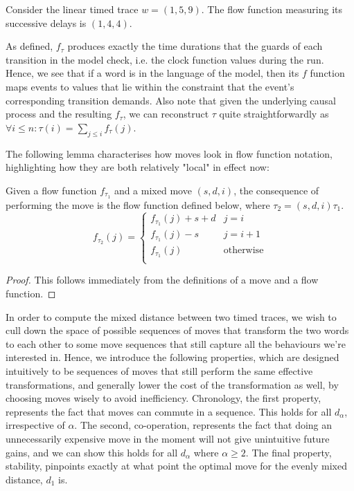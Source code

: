 \documentclass[runningheads]{llncs}
\newcounter{cases}
\begin{document}
    \begin{example}\label{wordandflow}
        Consider the linear timed trace $w = (1, 5, 9)$. The flow function measuring its successive delays is $(1, 4, 4)$. 
    \end{example}
    
    As defined, $f_\tau$ produces exactly the time durations that the guards of each transition in the model check, i.e. the clock function values during the run.
    Hence, we see that if a word is in the language of the model, then its $f$ function maps events to values that lie within the constraint that the event's corresponding transition demands. 
    Also note that given the underlying causal process and the resulting $f_\tau$, we can reconstruct $\tau$ quite straightforwardly as $\forall i \leq n: \tau(i) = \sum_{j \leq i} f_\tau(j)$. 
    
    The following lemma characterises how moves look in flow function notation, highlighting how they are both relatively "local" in effect now:
    
    \begin{lemma}\label{FlowFuncTrans}
        Given a flow function $f_{\tau_1}$ and a mixed move $(s, d, i)$, the consequence of performing the move is the flow function defined below, where $\tau_2 = (s, d, i)\tau_1$. 
        $$f_{\tau_2}(j) = \begin{cases} 
            f_{\tau_1}(j) + s + d & j = i\\
            f_{\tau_1}(j) - s  & j = i+1\\
            f_{\tau_1}(j)  & \textrm{otherwise}\\
        \end{cases}
        $$
        
    \end{lemma}
     \begin{proof}
        This follows immediately from the definitions of a move and a flow function. 
     \end{proof}
    
    In order to compute the mixed distance between two timed traces, we wish to cull down the space of possible sequences of moves that transform the two words to each other to some move sequences that still capture all the behaviours we're interested in. 
    Hence, we introduce the following properties, which are designed intuitively to be sequences of moves that still perform the same effective transformations, and generally lower the cost of the transformation as well, by choosing moves wisely to avoid inefficiency. 
    Chronology, the first property, represents the fact that moves can commute in a sequence. This holds for all $d_\alpha$, irrespective of $\alpha$. 
    The second, co-operation, represents the fact that doing an unnecessarily expensive move in the moment will not give unintuitive future gains, and we can show this holds for all $d_{\alpha}$ where $\alpha \geq 2$. 
    The final property, stability, pinpoints exactly at what point the optimal move for the evenly mixed distance, $d_1$ is. 
    
\end{document}
